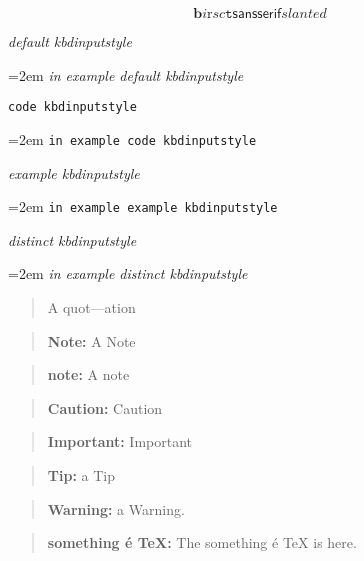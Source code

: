 \documentclass{book}
\begin{document}
\begin{titlepage}
$$
\mathbf{b} \mathit{i} \mathrm{r} sc \mathtt{t} \mathsf{sansserif} slanted
$$

{\ttfamily\textsl{default kbdinputstyle}}
\par\begingroup\obeylines\obeyspaces\frenchspacing\leftskip=2em\relax\parskip=0pt\relax\ttfamily{}%
{\ttfamily\textsl{in example default kbdinputstyle}}
\endgroup{}%

\texttt{code kbdinputstyle}
\par\begingroup\obeylines\obeyspaces\frenchspacing\leftskip=2em\relax\parskip=0pt\relax\ttfamily{}%
\texttt{in example code kbdinputstyle}
\endgroup{}%

{\ttfamily\textsl{example kbdinputstyle}}
\par\begingroup\obeylines\obeyspaces\frenchspacing\leftskip=2em\relax\parskip=0pt\relax\ttfamily{}%
\texttt{in example example kbdinputstyle}
\endgroup{}%

{\ttfamily\textsl{distinct kbdinputstyle}}
\par\begingroup\obeylines\obeyspaces\frenchspacing\leftskip=2em\relax\parskip=0pt\relax\ttfamily{}%
{\ttfamily\textsl{in example distinct kbdinputstyle}}
\endgroup{}%

\begin{quote}
A quot---ation
\end{quote}

\begin{quote}
\textbf{Note:} A Note
\end{quote}

\begin{quote}
\textbf{note:} A note
\end{quote}

\begin{quote}
\textbf{Caution:} Caution
\end{quote}

\begin{quote}
\textbf{Important:} Important
\end{quote}

\begin{quote}
\textbf{Tip:} a Tip
\end{quote}

\begin{quote}
\textbf{Warning:} a Warning.
\end{quote}

\begin{quote}
\textbf{something \'{e} \TeX{}:} The something \'{e} \TeX{} is here.
\end{quote}


\end{titlepage}
\end{document}
